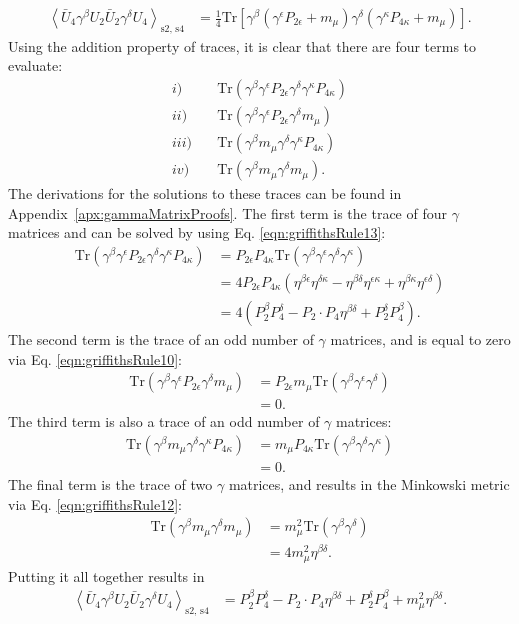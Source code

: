 \begin{align*}
\left< \bar{U}_4 \gamma^\beta U_2 \bar{U}_2 \gamma^\delta U_4 \right> _\text{s2, s4}
&=\frac{1}{4}\text{Tr}[\gamma^\beta(\gamma^\epsilon P_{2\epsilon}+m_\mu)\gamma^\delta (\gamma^\kappa P_{4\kappa}+m_\mu)].
\end{align*}
Using the addition property of traces, it is clear that there are four terms to evaluate:
\begin{align*}
i) &\quad \text{Tr}(\gamma^\beta \gamma^\epsilon P_{2\epsilon}\gamma^\delta\gamma^\kappa P_{4\kappa})\\
ii) &\quad \text{Tr}(\gamma^\beta \gamma^\epsilon P_{2\epsilon}\gamma^\delta m_\mu)\\
iii) &\quad \text{Tr}(\gamma^\beta m_\mu \gamma^\delta\gamma^\kappa P_{4\kappa})\\
iv) &\quad \text{Tr}(\gamma^\beta m_\mu \gamma^\delta m_\mu).
\end{align*}
The derivations for the solutions to these traces can be found in Appendix~\ref{apx:gammaMatrixProofs}. The first term is the trace of four $\gamma$ matrices and can be solved by using Eq. \eqref{eqn:griffithsRule13}:
\begin{align*}
\text{Tr}(\gamma^\beta \gamma^\epsilon P_{2\epsilon}\gamma^\delta\gamma^\kappa P_{4\kappa})
&= P_{2\epsilon}P_{4\kappa}\text{Tr}(\gamma^\beta \gamma^\epsilon\gamma^\delta\gamma^\kappa)\\
&=4P_{2\epsilon} P_{4\kappa} (\eta^{\beta\epsilon}\eta^{\delta\kappa}-\eta^{\beta\delta}\eta^{\epsilon\kappa}+\eta^{\beta\kappa}\eta^{\epsilon\delta})\\
&=4(P_2 ^\beta P_4 ^\delta - P_2 \cdot P_4 \eta^{\beta\delta} + P_2 ^\delta P_4 ^\beta).
\end{align*}
The second term is the trace of an odd number of $\gamma$ matrices, and is equal to zero via Eq. \eqref{eqn:griffithsRule10}:
\begin{align*}
\text{Tr}(\gamma^\beta \gamma^\epsilon P_{2\epsilon}\gamma^\delta m_\mu)
&= P_{2\epsilon}m_\mu\text{Tr}(\gamma^\beta \gamma^\epsilon\gamma^\delta)\\
&=0.
\end{align*}
The third term is also a trace of an odd number of $\gamma$ matrices:
\begin{align*}
\text{Tr}(\gamma^\beta m_\mu \gamma^\delta\gamma^\kappa P_{4\kappa})
&=m_\mu P_{4\kappa} \text{Tr}(\gamma^\beta  \gamma^\delta\gamma^\kappa)\\
&=0.
\end{align*}
The final term is the trace of two $\gamma$ matrices, and results in the Minkowski metric via Eq. \eqref{eqn:griffithsRule12}:
\begin{align*}
\text{Tr}(\gamma^\beta m_\mu \gamma^\delta m_\mu)
&=m_\mu ^2 \text{Tr}(\gamma^\beta \gamma^\delta)\\
&=4 m_\mu ^2 \eta^{\beta\delta}.
\end{align*}
Putting it all together results in
\begin{align*}
\left< \bar{U}_4 \gamma^\beta U_2 \bar{U}_2 \gamma^\delta U_4 \right> _\text{s2, s4}
&=P_2^\beta P_4^\delta - P_2 \cdot P_4 \eta^{\beta\delta}+P_2 ^\delta P_4 ^\beta + m_\mu ^2 \eta^{\beta\delta}.
\end{align*}

